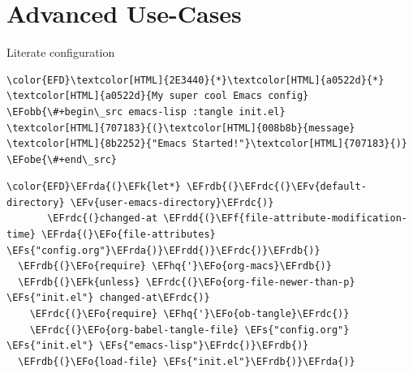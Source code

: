 \documentclass[presentation, t]{beamer}
\newcommand\efstrut{\vrule height 2.1ex depth 0.8ex width 0pt}
\newcommand{\EFs}[1]{\textcolor{EFs}{#1}} %
\newcommand{\EFk}[1]{\textcolor{EFk}{#1}} %
\newcommand{\EFf}[1]{\textcolor{EFf}{#1}} %
\newcommand{\EFv}[1]{\textcolor{EFv}{#1}} %
\newcommand{\EFo}[1]{\textcolor{EFo}{#1}} %
\newcommand{\EFobb}[1]{\colorbox{Efobb}{\efstrut{}\textcolor{EFobb}{#1}}} %
\newcommand{\EFobe}[1]{\colorbox{Efobe}{\efstrut{}\textcolor{EFobe}{#1}}} %
\newcommand{\EFhq}[1]{\textcolor{EFhq}{#1}} %
\newcommand{\EFrda}[1]{\textcolor{EFrda}{#1}} %
\newcommand{\EFrdb}[1]{\textcolor{EFrdb}{#1}} %
\newcommand{\EFrdc}[1]{\textcolor{EFrdc}{#1}} %
\newcommand{\EFrdd}[1]{\textcolor{EFrdd}{#1}} %
\begin{document}
\section{Advanced Use-Cases}
\label{sec:org853fdee}
\begin{frame}[label={sec:orgdb4666c},fragile]{Literate configuration}
 \begin{Code}
\begin{Verbatim}
\color{EFD}\textcolor[HTML]{2E3440}{*}\textcolor[HTML]{a0522d}{*} \textcolor[HTML]{a0522d}{My super cool Emacs config}
\EFobb{\#+begin\_src emacs-lisp :tangle init.el}
\textcolor[HTML]{707183}{(}\textcolor[HTML]{008b8b}{message} \textcolor[HTML]{8b2252}{"Emacs Started!"}\textcolor[HTML]{707183}{)}
\EFobe{\#+end\_src}
\end{Verbatim}
\end{Code}

\begin{Code}
\begin{Verbatim}
\color{EFD}\EFrda{(}\EFk{let*} \EFrdb{(}\EFrdc{(}\EFv{default-directory} \EFv{user-emacs-directory}\EFrdc{)}
       \EFrdc{(}changed-at \EFrdd{(}\EFf{file-attribute-modification-time} \EFrda{(}\EFo{file-attributes} \EFs{"config.org"}\EFrda{)}\EFrdd{)}\EFrdc{)}\EFrdb{)}
  \EFrdb{(}\EFo{require} \EFhq{'}\EFo{org-macs}\EFrdb{)}
  \EFrdb{(}\EFk{unless} \EFrdc{(}\EFo{org-file-newer-than-p} \EFs{"init.el"} changed-at\EFrdc{)}
    \EFrdc{(}\EFo{require} \EFhq{'}\EFo{ob-tangle}\EFrdc{)}
    \EFrdc{(}\EFo{org-babel-tangle-file} \EFs{"config.org"} \EFs{"init.el"} \EFs{"emacs-lisp"}\EFrdc{)}\EFrdb{)}
  \EFrdb{(}\EFo{load-file} \EFs{"init.el"}\EFrdb{)}\EFrda{)}
\end{Verbatim}
\end{Code}
\end{frame}
\end{document}
